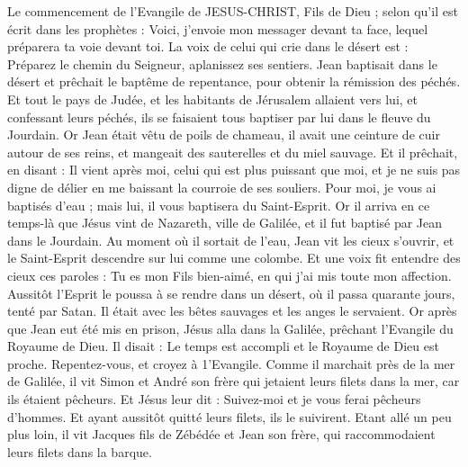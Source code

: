 \begin{multicols}{2}
\VerseOne{}Le commencement de l'Evangile de JESUS-CHRIST, Fils de Dieu ;
selon qu'il est écrit dans les prophètes : Voici, j'envoie mon messager devant ta face, lequel préparera ta voie devant toi.
La voix de celui qui crie dans le désert est : Préparez le chemin du Seigneur, aplanissez ses sentiers.
Jean baptisait dans le désert et prêchait le baptême de repentance, pour obtenir la rémission des péchés.
Et tout le pays de Judée, et les habitants de Jérusalem allaient vers lui, et confessant leurs péchés, ils se faisaient tous baptiser par lui dans le fleuve du Jourdain.
Or Jean était vêtu de poils de chameau, il avait une ceinture de cuir autour de ses reins, et mangeait des sauterelles et du miel sauvage.
Et il prêchait, en disant : Il vient après moi, celui qui est plus puissant que moi, et je ne suis pas digne de délier en me baissant la courroie de ses souliers.
Pour moi, je vous ai baptisés d'eau ; mais lui, il vous baptisera du Saint-Esprit.
Or il arriva en ce temps-là que Jésus vint de Nazareth, ville de Galilée, et il fut baptisé par Jean dans le Jourdain.
Au moment où il sortait de l'eau, Jean vit les cieux s'ouvrir, et le Saint-Esprit descendre sur lui comme une colombe.
Et une voix fit entendre des cieux ces paroles : Tu es mon Fils bien-aimé, en qui j'ai mis toute mon affection.
Aussitôt l'Esprit le poussa à se rendre dans un désert,
où il passa quarante jours, tenté par Satan. Il était avec les bêtes sauvages et les anges le servaient.
Or après que Jean eut été mis en prison, Jésus alla dans la Galilée, prêchant l'Evangile du Royaume de Dieu.
Il disait : Le temps est accompli et le Royaume de Dieu est proche. Repentez-vous, et croyez à 1'Evangile.
Comme il marchait près de la mer de Galilée, il vit Simon et André son frère qui jetaient leurs filets dans la mer, car ils étaient pêcheurs.
Et Jésus leur dit : Suivez-moi et je vous ferai pêcheurs d'hommes.
Et ayant aussitôt quitté leurs filets, ils le suivirent.
Etant allé un peu plus loin, il vit Jacques fils de Zébédée et Jean son frère, qui raccommodaient leurs filets dans la barque.

\end{multicols}
